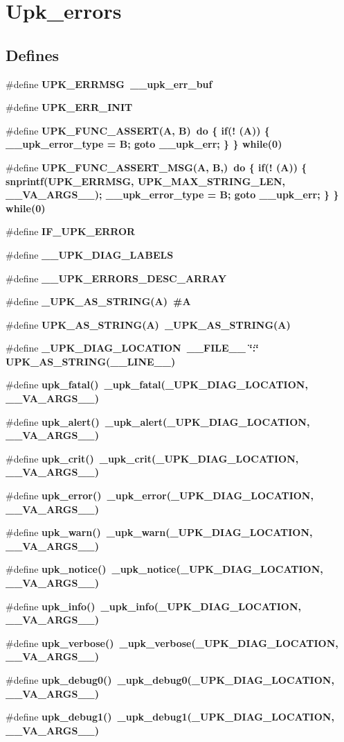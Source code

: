 \section{Upk\_\-errors}
\label{group__upk__errors}
\subsection*{Defines}
\begin{CompactItemize}
\item 
\#define \bf{UPK\_\-ERRMSG}~\_\-\_\-upk\_\-err\_\-buf
\item 
\#define \bf{UPK\_\-ERR\_\-INIT}
\item 
\#define \bf{UPK\_\-FUNC\_\-ASSERT}(A, B)~do \{ if(! (A)) \{ \_\-\_\-upk\_\-error\_\-type = B; goto \_\-\_\-upk\_\-err; \} \} while(0)
\item 
\#define \bf{UPK\_\-FUNC\_\-ASSERT\_\-MSG}(A, B,)~do \{ if(! (A)) \{ snprintf(UPK\_\-ERRMSG, UPK\_\-MAX\_\-STRING\_\-LEN, \_\-\_\-VA\_\-ARGS\_\-\_\-); \_\-\_\-upk\_\-error\_\-type = B; goto \_\-\_\-upk\_\-err; \} \} while(0)
\item 
\#define \bf{IF\_\-UPK\_\-ERROR}
\item 
\#define \bf{\_\-\_\-UPK\_\-DIAG\_\-LABELS}
\item 
\#define \bf{\_\-\_\-UPK\_\-ERRORS\_\-DESC\_\-ARRAY}
\item 
\#define \bf{\_\-UPK\_\-AS\_\-STRING}(A)~\#A
\item 
\#define \bf{UPK\_\-AS\_\-STRING}(A)~\_\-UPK\_\-AS\_\-STRING(A)
\item 
\#define \bf{\_\-UPK\_\-DIAG\_\-LOCATION}~\_\-\_\-FILE\_\-\_\- \char`\"{}:\char`\"{} UPK\_\-AS\_\-STRING(\_\-\_\-LINE\_\-\_\-)
\item 
\#define \bf{upk\_\-fatal}()~\_\-upk\_\-fatal(\_\-UPK\_\-DIAG\_\-LOCATION, \_\-\_\-VA\_\-ARGS\_\-\_\-)
\item 
\#define \bf{upk\_\-alert}()~\_\-upk\_\-alert(\_\-UPK\_\-DIAG\_\-LOCATION, \_\-\_\-VA\_\-ARGS\_\-\_\-)
\item 
\#define \bf{upk\_\-crit}()~\_\-upk\_\-crit(\_\-UPK\_\-DIAG\_\-LOCATION, \_\-\_\-VA\_\-ARGS\_\-\_\-)
\item 
\#define \bf{upk\_\-error}()~\_\-upk\_\-error(\_\-UPK\_\-DIAG\_\-LOCATION, \_\-\_\-VA\_\-ARGS\_\-\_\-)
\item 
\#define \bf{upk\_\-warn}()~\_\-upk\_\-warn(\_\-UPK\_\-DIAG\_\-LOCATION, \_\-\_\-VA\_\-ARGS\_\-\_\-)
\item 
\#define \bf{upk\_\-notice}()~\_\-upk\_\-notice(\_\-UPK\_\-DIAG\_\-LOCATION, \_\-\_\-VA\_\-ARGS\_\-\_\-)
\item 
\#define \bf{upk\_\-info}()~\_\-upk\_\-info(\_\-UPK\_\-DIAG\_\-LOCATION, \_\-\_\-VA\_\-ARGS\_\-\_\-)
\item 
\#define \bf{upk\_\-verbose}()~\_\-upk\_\-verbose(\_\-UPK\_\-DIAG\_\-LOCATION, \_\-\_\-VA\_\-ARGS\_\-\_\-)
\item 
\#define \bf{upk\_\-debug0}()~\_\-upk\_\-debug0(\_\-UPK\_\-DIAG\_\-LOCATION, \_\-\_\-VA\_\-ARGS\_\-\_\-)
\item 
\#define \bf{upk\_\-debug1}()~\_\-upk\_\-debug1(\_\-UPK\_\-DIAG\_\-LOCATION, \_\-\_\-VA\_\-ARGS\_\-\_\-)
\end{CompactItemize}

